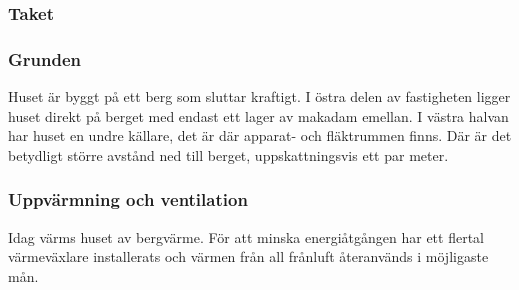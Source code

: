 
\subsubsection{Taket}

\subsubsection{Grunden}

Huset är byggt på ett berg som sluttar kraftigt. I östra delen av fastigheten ligger huset direkt på berget med endast ett lager av makadam emellan\cite{petersarneo}. I västra halvan har huset en undre källare, det är där apparat- och fläktrummen finns. Där är det betydligt större avstånd ned till berget, uppskattningsvis ett par meter. %

\subsubsection{Uppvärmning och ventilation}
Idag värms huset av bergvärme. För att minska energiåtgången har ett flertal värmeväxlare installerats och värmen från all frånluft återanvänds i möjligaste mån.
